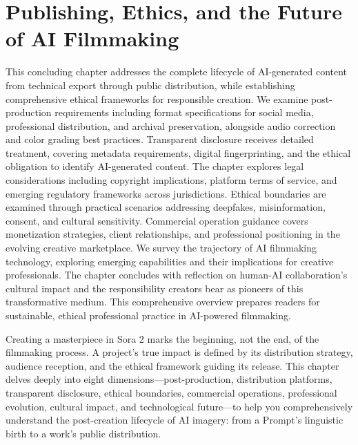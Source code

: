 \chapter{Publishing, Ethics, and the Future of AI Filmmaking}
\label{ch:publishing-ethics-future}

\begin{chapterabstract}
This concluding chapter addresses the complete lifecycle of AI-generated content from technical export through public distribution, while establishing comprehensive ethical frameworks for responsible creation. We examine post-production requirements including format specifications for social media, professional distribution, and archival preservation, alongside audio correction and color grading best practices. Transparent disclosure receives detailed treatment, covering metadata requirements, digital fingerprinting, and the ethical obligation to identify AI-generated content. The chapter explores legal considerations including copyright implications, platform terms of service, and emerging regulatory frameworks across jurisdictions. Ethical boundaries are examined through practical scenarios addressing deepfakes, misinformation, consent, and cultural sensitivity. Commercial operation guidance covers monetization strategies, client relationships, and professional positioning in the evolving creative marketplace. We survey the trajectory of AI filmmaking technology, exploring emerging capabilities and their implications for creative professionals. The chapter concludes with reflection on human-AI collaboration's cultural impact and the responsibility creators bear as pioneers of this transformative medium. This comprehensive overview prepares readers for sustainable, ethical professional practice in AI-powered filmmaking.
\end{chapterabstract}

Creating a masterpiece in Sora 2 marks the beginning, not the end, of the filmmaking process. A project's true impact is defined by its distribution strategy, audience reception, and the ethical framework guiding its release. This chapter delves deeply into eight dimensions—post-production, distribution platforms, transparent disclosure, ethical boundaries, commercial operations, professional evolution, cultural impact, and technological future—to help you comprehensively understand the post-creation lifecycle of AI imagery: from a Prompt's linguistic birth to a work's public distribution.

